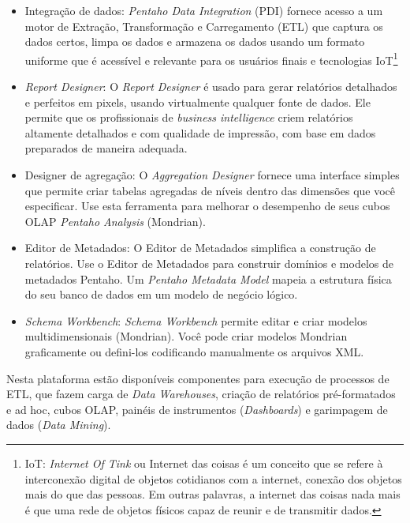 \begin{itemize}
   \item Integra\c{c}\~{a}o de dados: \textit{Pentaho Data Integration} (PDI) fornece acesso a um motor de Extra\c{c}\~{a}o, Transforma\c{c}\~{a}o e Carregamento (ETL) que captura os dados certos, limpa os dados e armazena os dados usando um formato uniforme que \'{e} acessível e relevante para os usu\'{a}rios finais e tecnologias IoT\footnote{IoT: \textit{Internet Of Tink} ou Internet das coisas \'{e} um conceito que se refere \`{a} interconex\~{a}o digital de objetos cotidianos com a internet, conex\~{a}o dos objetos mais do que das pessoas. Em outras palavras, a internet das coisas nada mais \'{e} que uma rede de objetos físicos capaz de reunir e de transmitir dados.}
   
   \item \textit{Report Designer}: O \textit{Report Designer} \'{e} usado para gerar relat\'orios detalhados e perfeitos em pixels, usando virtualmente qualquer fonte de dados. Ele permite que os profissionais de \textit{business intelligence} criem relat\'orios altamente detalhados e com qualidade de impress\~{a}o, com base em dados preparados de maneira adequada.

   \item Designer de agrega\c{c}\~{a}o: O \textit{Aggregation Designer} fornece uma interface simples que permite criar tabelas agregadas de níveis dentro das dimens\~{o}es que você especificar. Use esta ferramenta para melhorar o desempenho de seus cubos OLAP \textit{Pentaho Analysis} (Mondrian).

   \item Editor de Metadados: O Editor de Metadados simplifica a constru\c{c}\~{a}o de relat\'orios. Use o Editor de Metadados para construir domínios e modelos de metadados Pentaho. Um \textit{Pentaho Metadata Model} mapeia a estrutura física do seu banco de dados em um modelo de neg\'ocio l\'ogico.

    \item \textit{Schema Workbench}: \textit{Schema Workbench} permite editar e criar modelos multidimensionais (Mondrian). Você pode criar modelos Mondrian graficamente ou defini-los codificando manualmente os arquivos XML.
\end{itemize}

Nesta plataforma est\~{a}o disponíveis componentes para execu\c{c}\~{a}o de processos de ETL, que fazem carga de \textit{Data Warehouses}, cria\c{c}\~{a}o de relat\'orios pr\'{e}-formatados e ad hoc, cubos OLAP, pain\'{e}is de instrumentos (\textit{Dashboards}) e garimpagem de dados (\textit{Data Mining}). 

